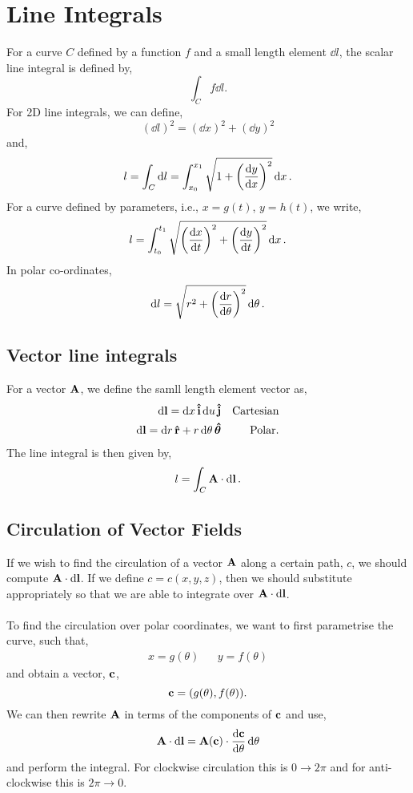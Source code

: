 \documentclass{book}
\begin{document}
\section{Line Integrals}
For a curve $C$ defined by a function $f$ and a small length element $\dd{l}$, the scalar line integral is defined by,
\begin{equation}
	\int_C f\dd{l}.
\end{equation}
For 2D line integrals, we can define,
\begin{equation}
	(\dd{l})^2 = (\dd{x})^2 + (\dd{y})^2
\end{equation}
and,
\begin{equation}
	l = \int_C \dd{l} = \int_{x_0}^{x_1} \sqrt{1 + \left(\dv{y}{x}\right)^2}\dd{x}.
\end{equation}
For a curve defined by parameters, i.e., $x = g(t)$, $y = h(t)$, we write,
\begin{equation}
	l = \int_{t_0}^{t_1}\sqrt{\left(\dv{x}{t}\right)^2 + \left(\dv{y}{t}\right)^2}\dd{x}.
\end{equation}
In polar co-ordinates,
\begin{equation}
	\dd{l} = \sqrt{r^2 + \left(\dv{r}{\theta}\right)^2}\dd{\theta}.
\end{equation}
\subsection{Vector line integrals}
For a vector $\vb{A}$, we define the samll length element vector as,
\begin{align}
	\dd{\vb{l}} = \dd{x}\vu{i} \dd{u}\vu{j} && \text{Cartesian} \\
	\dd{\vb{l}} = \dd{r}\vu{r} + r\dd{\theta}\vu*{\theta} && \text{Polar}.
\end{align}
The line integral is then given by,
\begin{equation}
	l = \int_C \vb{A} \cdot \dd{\vb{l}}.
\end{equation}
\subsection{Circulation of Vector Fields}
If we wish to find the circulation of a vector $\vb{A}$ along a certain path, $c$, we should compute $\vb{A}\cdot\dd{\vb{l}}$. If we define $c = c(x,y,z)$, then we should substitute appropriately so that we are able to integrate over $\vb{A}\cdot\dd{\vb{l}}$.
\\\\
To find the circulation over polar coordinates, we want to first parametrise the curve, such that,
\begin{align}
	x = g(\theta) && y = f(\theta)
\end{align}
and obtain a vector, $\vb{c}$,
\begin{equation}
	\vb{c} = (g(\theta),f(\theta)).
\end{equation}
We can then rewrite $\vb{A}$ in terms of the components of $\vb{c}$ and use,
\begin{equation}
	\vb{A}\cdot\dd{\vb{l}} = \vb{A}(\vb{c}) \cdot \dv{\vb{c}}{\theta}\dd{\theta}
\end{equation}
and perform the integral. For clockwise circulation this is $0 \to 2\pi$ and for anti-clockwise this is $2\pi \to 0$.
\appendix
\end{document}
